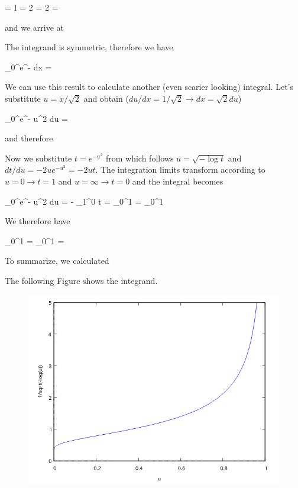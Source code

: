 \bee
{} =  \rightarrow I = 2  = 2  = \sqrt{2 \pi}
\eee

and we arrive at

\bee
{}
\eee

The integrand is symmetric, therefore we have

\bee
\int_{0}^\infty e^{-} dx = 
\eee

We can use this result to calculate another (even scarier looking) integral. Let's substitute $u = x / \sqrt{2}$ and obtain ($du/dx = 1 / \sqrt{2} \rightarrow dx = \sqrt{2} du$)

\bee
\int_{0}^\infty e^{- u^2 }  du = 
\eee

and therefore

\bee
{}
\eee

Now we substitute $t = e^{-u^2}$ from which follows $u = \sqrt{- \log t}$ and $dt/du = -2ue^{-u^2} = -2ut$. The integration limits transform according to $u = 0 \rightarrow t = 1$ and $u = \infty \rightarrow t = 0$ and the integral becomes

\bee
\int_{0}^\infty e^{- u^2 } du = - \int_1^0 t  = \int_0^1  = \int_0^1 
\eee

We therefore have

\bee
\int_0^1  =  \rightarrow \int_0^1  = \sqrt{\pi}
\eee

To summarize, we calculated

\bee
{}
\eee

The following Figure shows the integrand.

\begin{figure}[H]
    \includegraphics[scale=0.7]{images/2022-03-21_plot_2a.png}
\end{figure}

